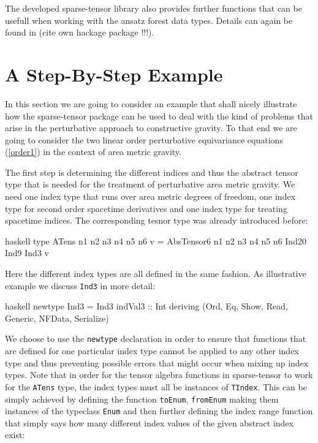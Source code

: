 \documentclass[a4paper,12pt, DIV=14, BCOR=5mm, twoside, headsepline]{scrbook}
\begin{document}
The developed sparse-tensor library also provides further functions that can be usefull when working with the ansatz forest data types. Details can again be found in (cite own hackage package !!!).

\section{A Step-By-Step Example}
In this section we are going to consider an example that shall nicely illustrate how the sparse-tensor package can be used to deal with the kind of problems that arise in the perturbative approach to constructive gravity. To that end we are going to consider the two linear order perturbative equivariance equations (\ref{order1}) in the context of area metric gravity. 

The first step is determining the different indices and thus the abstract tensor type that is needed for the treatment of perturbative area metric gravity. 
We need one index type that runs over area metric degrees of freedom, one index type for second order spacetime derivatives and one index type for treating spacetime indices. The corresponding tesnor type was already introduced before:

\begin{center}
\begin{cminted}{haskell}
type ATens n1 n2 n3 n4 n5 n6 v = 
     AbsTensor6 n1 n2 n3 n4 n5 n6 Ind20 Ind9 Ind3 v
\end{cminted}
\end{center}

Here the different index types are all defined in the same fashion. As illustrative example we discuss \texttt{Ind3} in more detail:

\begin{center}
\begin{cminted}{haskell}
newtype Ind3 =  Ind3 {indVal3 :: Int}
    deriving (Ord, Eq, Show, Read, Generic, NFData, Serialize)
\end{cminted}
\end{center}

We choose to use the \texttt{newtype} declaration in order to ensure that functions that are defined for one particular index type cannot be applied to any other index type and thus preventing possible errors that might occur when mixing up index types.
Note that in order for the tensor algebra functions in sparse-tensor to work for the \texttt{ATens} type, the index types must all be instances of \texttt{TIndex}. This can be simply achieved by defining the function \texttt{toEnum}, \texttt{fromEnum} making them instances of the typeclass \texttt{Enum} and then further defining the index range function that simply says how many different index values of the given abstract index exist:
\end{document}
